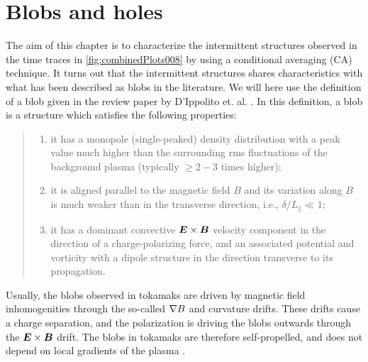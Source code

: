\section{Blobs and holes}
\label{sec:blobsAndHoles}
%
The aim of this chapter is to characterize the intermittent structures observed in the time traces in \cref{fig:combinedPlots008} by using a conditional averaging (CA) technique.
It turns out that the intermittent structures shares characteristics with what has been described as blobs in the literature.
We will here use the definition of a blob given in the review paper by D'Ippolito et. al. \cite{DIppolito2011}.
In this definition, a blob is a structure which satisfies the following properties:
%
\begin{quote}
    \begin{enumerate}[noitemsep]
            \item  it has a monopole (single-peaked) density distribution with a peak value much higher than the surrounding rms fluctuations of the background plasma (typically $\geq 2-3$ times higher);
            \item  it is aligned parallel to the magnetic field $B$ and its variation along $B$ is much weaker than in the transverse direction, i.e., $\delta/L_\|\ll1$;
            \item it has a dominant convective $\boldsymbol{E}\times\boldsymbol{B}$ velocity component in the direction of a charge-polarizing force, and an associated potential and vorticity with a dipole structure in the direction transverse to its propagation.
    \end{enumerate}
\end{quote}
%
Usually, the blobs observed in tokamaks are driven by magnetic field inhomogenities through the so-called $\nabla B$ and curvature drifts.
These drifts cause a charge separation, and the polarization is driving the blobs outwards through the $\boldsymbol{E}\times\boldsymbol{B}$ drift.
The blobs in tokamaks are therefore self-propelled, and does not depend on local gradients of the plasma \cite{Krasheninnikov2008}.

